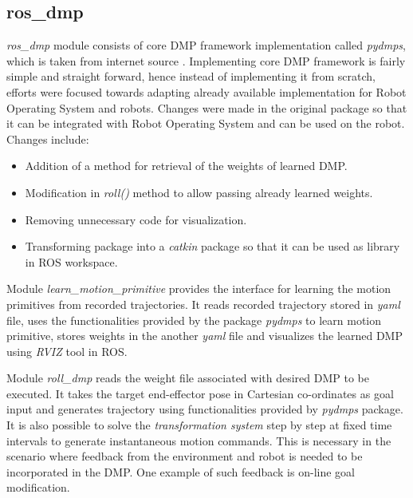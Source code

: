 \subsection{ros\_dmp} \textit{ros\_dmp} module consists of core DMP framework implementation called \textit{pydmps}, which is taken from internet source \cite{pydmps}. Implementing core DMP framework is fairly simple and straight forward, hence instead of implementing it from scratch, efforts were focused towards adapting already available implementation for Robot Operating System and robots. Changes were made in the original package so that it can be integrated with Robot Operating System and can be used on the robot. Changes include:
\begin{itemize}
	\item Addition of a method for retrieval of the weights of learned DMP.
	\item Modification in \textit{roll()} method to allow passing already learned weights.
	\item Removing unnecessary code for visualization. 
	\item Transforming package into a \textit{catkin} package so that it can be used as library in ROS workspace.
\end{itemize} 

Module \textit{learn\_motion\_primitive} provides the interface for learning the motion primitives from recorded trajectories. It reads recorded trajectory stored in \textit{yaml} file, uses the functionalities provided by the package \textit{pydmps} to learn motion primitive, stores weights in the another \textit{yaml} file and visualizes the learned DMP using \textit{RVIZ} tool in ROS.

Module \textit{roll\_dmp} reads the weight file associated with desired DMP to be executed. It takes the target end-effector pose in Cartesian co-ordinates as goal input and generates trajectory using functionalities provided by \textit{pydmps} package. It is also possible to solve the \textit{transformation system} step by step at fixed time intervals to generate instantaneous motion commands. This is necessary in the scenario where feedback from the environment and robot is needed to be incorporated in the DMP. One example of such feedback is on-line goal modification.      



